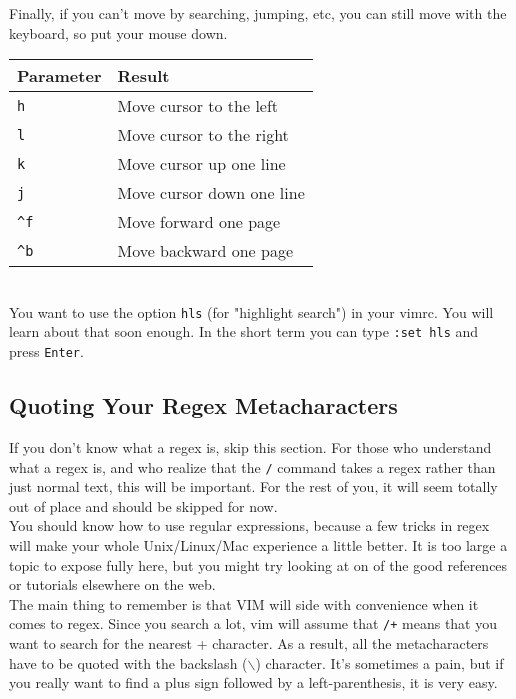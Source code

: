 \documentclass[a4paper, 12pt]{article}
\begin{document}
\noindent
Finally, if you can't move by searching, jumping, etc, you can still move with the keyboard, so put your mouse down.

\begin{tabular}{ l | p{9cm}}
  {\bf Parameter} & {\bf Result} \\ \hline
  \texttt{h} & Move cursor to the left\\
  \texttt{l} & Move cursor to the right\\
  \texttt{k} & Move cursor up one line\\
  \texttt{j} & Move cursor down one line\\
  \texttt{\^{}f} & Move forward one page\\
  \texttt{\^{}b} & Move backward one page\\ \hline
\end{tabular}\\

You want to use the option \texttt{hls} (for "highlight search") in your vimrc. You will learn about that soon enough. In the short term you can type \texttt{:set hls} and press \texttt{Enter}.

\subsection{Quoting Your Regex Metacharacters}
\label{QuotingYourRegeXMetacharacters}
If you don't know what a regex is, skip this section. For those who understand what a regex is, and who realize that the \texttt{/} command takes a regex rather than just normal text, this will be important. For the rest of you, it will seem totally out of place and should be skipped for now.\\
You should know how to use regular expressions, because a few tricks in regex will make your whole Unix/Linux/Mac experience a little better. It is too large a topic to expose fully here, but you might try looking at on of the good references or tutorials elsewhere on the web.\\
The main thing to remember is that VIM will side with convenience when it comes to regex. Since you search a lot, vim will assume that \texttt{/+} means that you want to search for the nearest + character. As a result, all the metacharacters have to be quoted with the backslash (\texttt{$\backslash$}) character. It's sometimes a pain, but if you really want to find a plus sign followed by a left-parenthesis, it is very easy.
\end{document}
